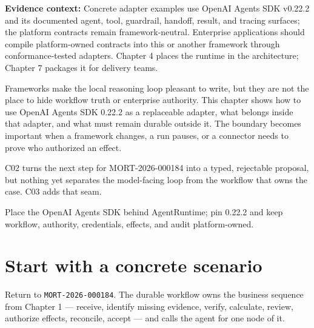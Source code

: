 

\begin{bookquote}

\textbf{Evidence context:} Concrete adapter examples use OpenAI Agents SDK v0.22.2 and its documented agent, tool, guardrail, handoff, result, and tracing surfaces; the platform contracts remain framework-neutral. \textbf{} Enterprise applications should compile platform-owned contracts into this or another framework through conformance-tested adapters. Chapter 4 places the runtime in the architecture; Chapter 7 packages it for delivery teams.

\end{bookquote}

Frameworks make the local reasoning loop pleasant to write, but they are not the place to hide workflow truth or enterprise authority. This chapter shows how to use OpenAI Agents SDK 0.22.2 as a replaceable adapter, what belongs inside that adapter, and what must remain durable outside it. The boundary becomes important when a framework changes, a run pauses, or a connector needs to prove who authorized an effect.\par

\begin{bookcallout}
C02 turns the next step for MORT-2026-000184 into a typed, rejectable proposal, but nothing yet separates the model-facing loop from the workflow that owns the case. C03 adds that seam.
\end{bookcallout}

\begin{bookcallout}
Place the OpenAI Agents SDK behind AgentRuntime; pin 0.22.2 and keep workflow, authority, credentials, effects, and audit platform-owned.
\end{bookcallout}

\section{Start with a concrete scenario}

Return to \lstinline[style=bookinline]!MORT-2026-000184!. The durable workflow owns the business sequence from Chapter 1 — receive, identify missing evidence, verify, calculate, review, authorize effects, reconcile, accept — and calls the agent for one node of it.\par

